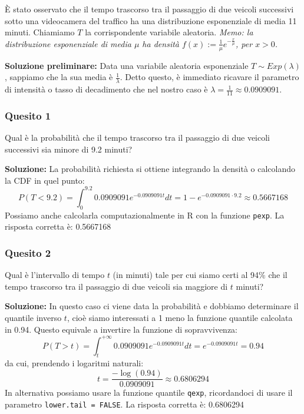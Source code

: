 \documentclass[12pt, a4paper]{article}
\begin{document}
\vspace{0.5cm}
\begin{tcolorbox}[colback=lightergray!10, colframe=tocsec, title=\textbf{Esercizio 5}]
È stato osservato che il tempo trascorso tra il passaggio di due veicoli successivi sotto una videocamera del traffico ha una distribuzione esponenziale di media 11 minuti. Chiamiamo $T$ la corrispondente variabile aleatoria. 
\textit{Memo: la distribuzione esponenziale di media $\mu$ ha densità $f(x) := \frac{1}{\mu} e^{-\frac{x}{\mu}}$, per $x>0$.}
\end{tcolorbox}

\vspace{0.3cm}
\textbf{Soluzione preliminare:} Data una variabile aleatoria esponenziale $T \sim Exp(\lambda)$, sappiamo che la sua media è $\frac{1}{\lambda}$.
Detto questo, è immediato ricavare il parametro di intensità o tasso di decadimento che nel nostro caso è $\lambda = \frac{1}{11} \approx 0.0909091$.

\newpage

\subsubsection*{Quesito 1}
Qual è la probabilità che il tempo trascorso tra il passaggio di due veicoli successivi sia minore di 9.2 minuti?

\textbf{Soluzione:}
La probabilità richiesta si ottiene integrando la densità o calcolando la CDF in quel punto:
$$ P(T < 9.2) = \int_0^{9.2} 0.0909091 e^{-0.0909091 t} dt = 1 - e^{-0.0909091 \cdot 9.2} \approx 0.5667168 $$
Possiamo anche calcolarla computazionalmente in R con la funzione \texttt{pexp}.
La risposta corretta è: 0.5667168

\subsubsection*{Quesito 2}
Qual è l’intervallo di tempo $t$ (in minuti) tale per cui siamo certi al 94\% che il tempo trascorso tra il passaggio di due veicoli sia maggiore di $t$ minuti?

\textbf{Soluzione:}
In questo caso ci viene data la probabilità e dobbiamo determinare il quantile inverso $t$, cioè siamo interessati a 1 meno la funzione quantile calcolata in 0.94. Questo equivale a invertire la funzione di sopravvivenza:
$$ P(T > t) = \int_t^{+\infty} 0.0909091 e^{-0.0909091 t} dt = e^{-0.0909091 t} = 0.94 $$
da cui, prendendo i logaritmi naturali:
$$ t = \frac{-\log(0.94)}{0.0909091} \approx 0.6806294 $$
In alternativa possiamo usare la funzione quantile \texttt{qexp}, ricordandoci di usare il parametro \texttt{lower.tail = FALSE}.
La risposta corretta è: 0.6806294
\end{document}
